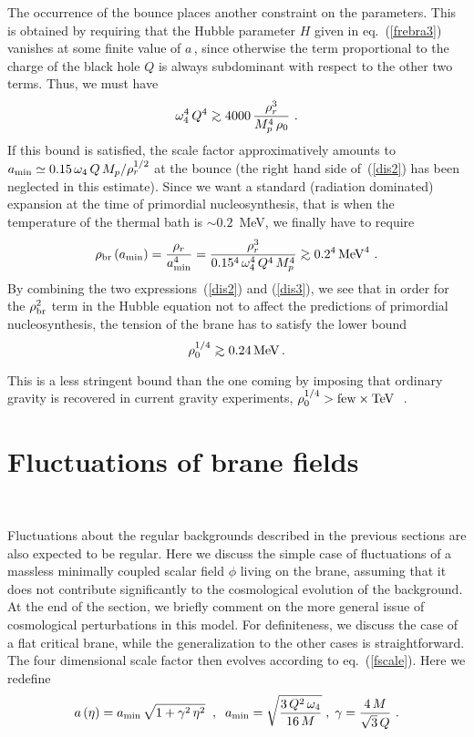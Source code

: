 \documentclass[a4paper,11pt]{article}
\def\ga{\mathrel{\raise.3ex\hbox{$>$\kern-.75em\lower1ex\hbox{$\sim$}}}}
\begin{document}
The occurrence of the bounce places another constraint on the parameters.
This is obtained by requiring that the Hubble parameter $H$ given in
eq.~(\ref{frebra3}) vanishes at some finite value of $a\,$, since
otherwise the term proportional to the charge of the black hole $Q$ is
always subdominant with respect to the other two terms. Thus, we must have
%
\begin{equation}
\omega_4^4 \, Q^4 \ga 4000 \, \frac{\rho_r^3}{M_p^4 \, \rho_0} \,\,.
\label{dis2}
\end{equation}
%
If this bound is satisfied, the scale factor approximatively amounts to
$a_{\rm min} \simeq 0.15 \, \omega_4 \, Q \, M_p/\rho_r^{1/2}$ at the
bounce (the right hand side of~(\ref{dis2}) has been neglected in this estimate). Since we want a standard (radiation dominated) expansion at the
time of primordial nucleosynthesis, that is when the temperature of the
thermal bath is $\sim 0.2 \,$ MeV, we finally have to require
%
\begin{equation}
\rho_{\rm br} \left( a_{\rm min} \right) = \frac{\rho_r}{a_{\rm min}^4} =
\frac{\rho_r^3}{0.15^4 \, \omega_4^4 \, Q^4 \, M_p^4} \ga 0.2^4 \, {\rm MeV}^4 \,\,.
\label{dis3}
\end{equation}
%
By combining the two expressions~(\ref{dis2}) and (\ref{dis3}), we see
that in order for the $\rho_{\rm br}^2$ term in the Hubble equation not to
affect the predictions of primordial nucleosynthesis, the tension of the
brane has to satisfy the lower bound
%
\begin{equation}
\rho_0^{1/4}  \ga 0.24 \, {\rm MeV} \,.
\end{equation}

This is a less stringent bound than the one coming by imposing that
ordinary gravity is recovered in current gravity experiments,
$\rho_0^{1/4} > {\rm few} \times {\rm TeV} \,$~\cite{CED}.

\section{Fluctuations of brane fields}~\label{pert}

Fluctuations about the regular backgrounds described in the previous
sections are also expected to be regular. Here we discuss the simple case
of fluctuations of a massless minimally coupled scalar field $\phi$ living
on the brane, assuming that it does not contribute significantly to the
cosmological evolution of the background. At the end of the section, we
briefly comment on the more general issue of cosmological perturbations in
this model.  For definiteness, we discuss the case of a flat critical
brane, while the generalization to the other cases is straightforward. The
four dimensional scale factor then evolves according to
eq.~(\ref{fscale}). Here we redefine
%
\begin{equation}
a \left( \eta \right) = a_{\rm min} \, \sqrt{1+ \gamma^2 \, \eta^2} \;\;,\;\; a_{\rm min} = \sqrt{\frac{3 \, Q^2 \, \omega_4}{16 \, M}}
\;,\; \gamma=\frac{4\,M}{\sqrt{3}\,Q} \,\,.
\label{eqa}
\end{equation}
\end{document}
